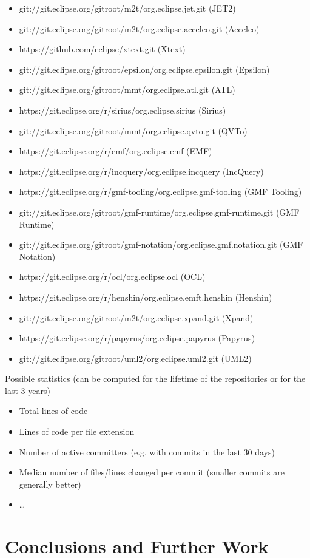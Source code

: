 \documentclass[runningheads,a4paper]{llncs}
\begin{document}
\begin{itemize}
  \item git://git.eclipse.org/gitroot/m2t/org.eclipse.jet.git (JET2)
  \item git://git.eclipse.org/gitroot/m2t/org.eclipse.acceleo.git (Acceleo)
  \item https://github.com/eclipse/xtext.git (Xtext)
  \item git://git.eclipse.org/gitroot/epsilon/org.eclipse.epsilon.git (Epsilon)
  \item git://git.eclipse.org/gitroot/mmt/org.eclipse.atl.git (ATL)
  \item https://git.eclipse.org/r/sirius/org.eclipse.sirius (Sirius)
  \item git://git.eclipse.org/gitroot/mmt/org.eclipse.qvto.git (QVTo)
  \item https://git.eclipse.org/r/emf/org.eclipse.emf (EMF)
  \item https://git.eclipse.org/r/incquery/org.eclipse.incquery (IncQuery)
  \item https://git.eclipse.org/r/gmf-tooling/org.eclipse.gmf-tooling (GMF Tooling)
  \item git://git.eclipse.org/gitroot/gmf-runtime/org.eclipse.gmf-runtime.git (GMF Runtime)
  \item git://git.eclipse.org/gitroot/gmf-notation/org.eclipse.gmf.notation.git  (GMF Notation)
  \item https://git.eclipse.org/r/ocl/org.eclipse.ocl (OCL)
  \item https://git.eclipse.org/r/henshin/org.eclipse.emft.henshin (Henshin)
  \item git://git.eclipse.org/gitroot/m2t/org.eclipse.xpand.git (Xpand)
  \item https://git.eclipse.org/r/papyrus/org.eclipse.papyrus (Papyrus)
  \item git://git.eclipse.org/gitroot/uml2/org.eclipse.uml2.git (UML2)
\end{itemize}

Possible statistics (can be computed for the lifetime of the repositories or for the last 3 years)
\begin{itemize}
  \item Total lines of code
  \item Lines of code per file extension 
  \item Number of active committers (e.g. with commits in the last 30 days)
  \item Median number of files/lines changed per commit (smaller commits are generally better)
  \item \ldots
\end{itemize}

\section{Conclusions and Further Work}



\end{document}
